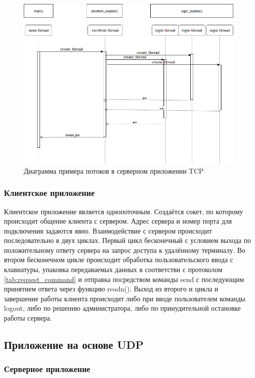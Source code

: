 \begin{figure}[H]
\centering
\includegraphics[width=1\textwidth]{pics/tcpthread.png}
\caption{Диаграмма примера потоков в серверном приложении TCP}
\label{tcp_thr}
\end{figure}

\subsubsection{Клиентское приложение}

Клиентское приложение является однопоточным. Создаётся сокет, по которому происходит общение клиента с сервером. Адрес сервера и номер порта для подключения задаются явно. Взаимодействие с сервером происходит последовательно в двух циклах. Первый цикл бесконечный с условием выхода по положительному ответу сервера на запрос доступа к удалённому терминалу. Во втором бесконечном цикле происходит обработка пользовательского ввода с клавиатуры, упаковка передаваемых данных в соответстви с протоколом \ref{tab:request_command} и отправка посредством команды send с последующим принятием ответа через функцию readn(). Выход из второго и цикла и завершение работы клиента происходит либо при вводе пользователем команды logout, либо по решению администратора, либо по принудительной остановке работы сервера.

\subsection{Приложение на основе UDP}
\subsubsection{Серверное приложение}

